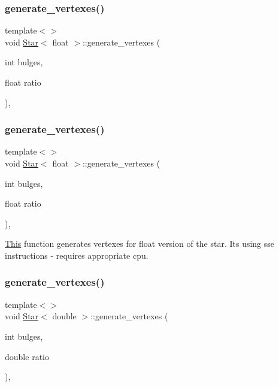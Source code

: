 \subsubsection{\texorpdfstring{generate\+\_\+vertexes()}{generate\_vertexes()}\hspace{0.1cm}{\footnotesize\ttfamily [3/6]}}
{\footnotesize\ttfamily template$<$$>$ \\
void \mbox{\hyperlink{classStar}{Star}}$<$ float $>$\+::generate\+\_\+vertexes (\begin{DoxyParamCaption}\item[{int}]{bulges,  }\item[{float}]{ratio }\end{DoxyParamCaption})\hspace{0.3cm}{\ttfamily [inline]}, {\ttfamily [private]}}

\mbox{\label{classStar_ab46cbc7aca971bc1c07b8d4afe8fba37}} 
\subsubsection{\texorpdfstring{generate\+\_\+vertexes()}{generate\_vertexes()}\hspace{0.1cm}{\footnotesize\ttfamily [4/6]}}
{\footnotesize\ttfamily template$<$$>$ \\
void \mbox{\hyperlink{classStar}{Star}}$<$ float $>$\+::generate\+\_\+vertexes (\begin{DoxyParamCaption}\item[{int}]{bulges,  }\item[{float}]{ratio }\end{DoxyParamCaption})\hspace{0.3cm}{\ttfamily [inline]}, {\ttfamily [private]}}



\mbox{\hyperlink{classThis}{This}} function generates vertexes for float version of the star. It\textquotesingle{}s using sse instructions -\/ requires appropriate cpu. 

\mbox{\label{classStar_a85d8438cea72701a136b76f046ee95dd}} 
\subsubsection{\texorpdfstring{generate\+\_\+vertexes()}{generate\_vertexes()}\hspace{0.1cm}{\footnotesize\ttfamily [5/6]}}
{\footnotesize\ttfamily template$<$$>$ \\
void \mbox{\hyperlink{classStar}{Star}}$<$ double $>$\+::generate\+\_\+vertexes (\begin{DoxyParamCaption}\item[{int}]{bulges,  }\item[{double}]{ratio }\end{DoxyParamCaption})\hspace{0.3cm}{\ttfamily [inline]}, {\ttfamily [private]}}

